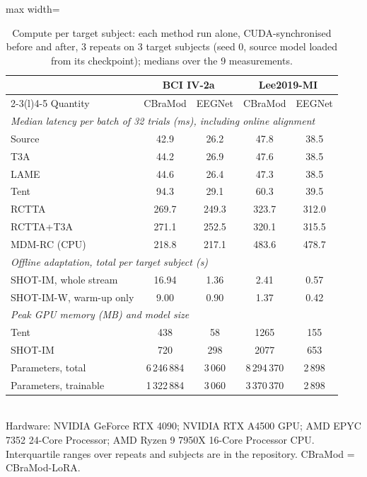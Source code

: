 \documentclass[preprint,12pt]{elsarticle}
\newcommand{\revfloat}{}
\begin{document}
\begin{table}[!htbp]
\centering
\caption{Compute per target subject: each method run alone, CUDA-synchronised before and after, 3 repeats on 3 target subjects (seed 0, source model loaded from its checkpoint); medians over the 9 measurements.}
\label{tab:time}
\revfloat
\setlength{\tabcolsep}{3pt}
\begin{adjustbox}{max width=\textwidth}
\begin{tabular}{@{}lcccc@{}}
\toprule
 & \multicolumn{2}{c}{BCI IV-2a} & \multicolumn{2}{c}{Lee2019-MI} \\
\cmidrule(lr){2-3}\cmidrule(l){4-5}
Quantity & CBraMod & EEGNet & CBraMod & EEGNet \\
\midrule
\multicolumn{5}{l}{\textit{Median latency per batch of 32 trials (ms), including online alignment}}\\
Source & 42.9 & 26.2 & 47.8 & 38.5 \\
T3A & 44.2 & 26.9 & 47.6 & 38.5 \\
LAME & 44.6 & 26.4 & 47.3 & 38.5 \\
Tent & 94.3 & 29.1 & 60.3 & 39.5 \\
RCTTA & 269.7 & 249.3 & 323.7 & 312.0 \\
RCTTA+T3A & 271.1 & 252.5 & 320.1 & 315.5 \\
MDM-RC (CPU) & 218.8 & 217.1 & 483.6 & 478.7 \\
\midrule
\multicolumn{5}{l}{\textit{Offline adaptation, total per target subject (s)}}\\
SHOT-IM, whole stream & 16.94 & 1.36 & 2.41 & 0.57 \\
SHOT-IM-W, warm-up only & 9.00 & 0.90 & 1.37 & 0.42 \\
\midrule
\multicolumn{5}{l}{\textit{Peak GPU memory (MB) and model size}}\\
Tent & 438 & 58 & 1265 & 155 \\
SHOT-IM & 720 & 298 & 2077 & 653 \\
Parameters, total & 6\,246\,884 & 3\,060 & 8\,294\,370 & 2\,898 \\
Parameters, trainable & 1\,322\,884 & 3\,060 & 3\,370\,370 & 2\,898 \\
\bottomrule
\end{tabular}
\end{adjustbox}\\[2pt]
{\footnotesize Hardware: NVIDIA GeForce RTX 4090; NVIDIA RTX A4500 GPU; AMD EPYC 7352 24-Core Processor; AMD Ryzen 9 7950X 16-Core Processor CPU. Interquartile ranges over repeats and subjects are in the repository. CBraMod = CBraMod-LoRA.}
\end{table}
\end{document}
